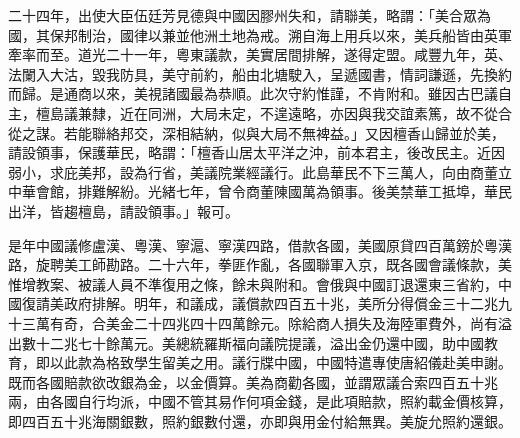 \begin{pinyinscope}
二十四年，出使大臣伍廷芳見德與中國因膠州失和，請聯美，略謂：「美合眾為國，其保邦制治，國律以兼並他洲土地為戒。溯自海上用兵以來，美兵船皆由英軍牽率而至。道光二十一年，粵東議款，美實居間排解，遂得定盟。咸豐九年，英、法闌入大沽，毀我防具，美守前約，船由北塘駛入，呈遞國書，情詞謙遜，先換約而歸。是通商以來，美視諸國最為恭順。此次守約惟謹，不肯附和。雖因古巴議自主，檀島議兼隸，近在同洲，大局未定，不遑遠略，亦因與我交誼素篤，故不從合從之謀。若能聯絡邦交，深相結納，似與大局不無裨益。」又因檀香山歸並於美，請設領事，保護華民，略謂：「檀香山居太平洋之沖，前本君主，後改民主。近因弱小，求庇美邦，設為行省，美議院業經議行。此島華民不下三萬人，向由商董立中華會館，排難解紛。光緒七年，曾令商董陳國萬為領事。後美禁華工抵埠，華民出洋，皆趨檀島，請設領事。」報可。

是年中國議修盧漢、粵漢、寧滬、寧漢四路，借款各國，美國原貸四百萬鎊於粵漢路，旋聘美工師勘路。二十六年，拳匪作亂，各國聯軍入京，既各國會議條款，美惟增教案、被議人員不準復用之條，餘未與附和。會俄與中國訂退還東三省約，中國復請美政府排解。明年，和議成，議償款四百五十兆，美所分得償金三十二兆九十三萬有奇，合美金二十四兆四十四萬餘元。除給商人損失及海陸軍費外，尚有溢出數十二兆七十餘萬元。美總統羅斯福向議院提議，溢出金仍還中國，助中國教育，即以此款為格致學生留美之用。議行牒中國，中國特遣專使唐紹儀赴美申謝。既而各國賠款欲改銀為金，以金價算。美為商勸各國，並謂眾議合索四百五十兆兩，由各國自行均派，中國不管其易作何項金錢，是此項賠款，照約載金價核算，即四百五十兆海關銀數，照約銀數付還，亦即與用金付給無異。美旋允照約還銀。


\end{pinyinscope}
